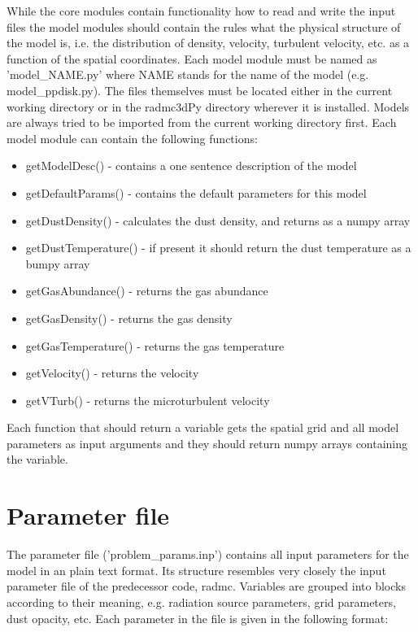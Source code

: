 \documentclass[12pt]{article}
\begin{document}
While the core modules contain functionality how to read and write the input files the model modules
should contain the rules what the physical structure of the model is, i.e. the distribution of density, velocity, 
turbulent velocity, etc. as a function of the spatial coordinates. Each model module must be named as
'model\_NAME.py' where NAME stands for the name of the model (e.g. model\_ppdisk.py). The files
themselves must be located either in the current working directory or in the radmc3dPy directory wherever
it is installed. Models are always tried to be imported from the current working directory first. 
Each model module can contain the following functions:
\begin{itemize}
\item[] getModelDesc() - contains a one sentence description of the model
\item[] getDefaultParams() - contains the default parameters for this model
\item[] getDustDensity() - calculates the dust density, and returns as a numpy array
\item[] getDustTemperature() - if present it should return the dust temperature as a bumpy array 
\item[] getGasAbundance() - returns the gas abundance 
\item[] getGasDensity() - returns the gas density
\item[] getGasTemperature() - returns the gas temperature
\item[] getVelocity() - returns the velocity 
\item[] getVTurb() - returns the microturbulent velocity
\end{itemize}
Each function that should return a variable gets the spatial grid and all model parameters as input  arguments
and they should return numpy arrays containing the variable. 

\section{Parameter file}
\label{sec:parfile}
The parameter file ('problem\_params.inp') contains all input parameters for the model in an plain text format. Its structure 
resembles very closely the input parameter file of the predecessor code, radmc. Variables are grouped into blocks according to their
meaning, e.g. radiation source parameters, grid parameters, dust opacity, etc. Each parameter in the file is given in the following
format: 
\end{document}
